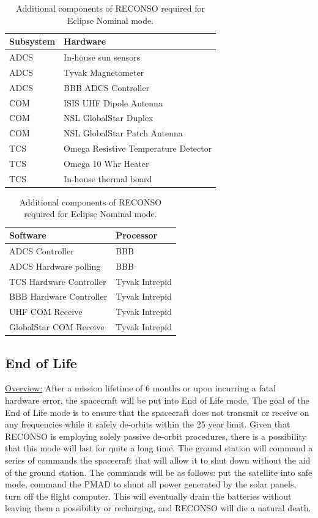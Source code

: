 \documentclass{article}
\begin{document}
\begin{table}[h!]
\caption{Additional components of RECONSO required for Eclipse Nominal mode.}
\begin{adjustbox}{center}
\begin{tabular}{|l|l|}
\hline
Subsystem & Hardware \\ \hline \hline
ADCS & In-house sun sensors  \\ \hline
ADCS & Tyvak Magnetometer \\ \hline
ADCS & BBB ADCS Controller \\ \hline \hline
COM & ISIS UHF Dipole Antenna  \\ \hline
COM & NSL GlobalStar Duplex  \\ \hline
COM & NSL GlobalStar Patch Antenna \\ \hline \hline
TCS & Omega Resistive Temperature Detector \\ \hline
TCS & Omega 10 Whr Heater  \\ \hline
TCS & In-house thermal board \\ \hline
\end{tabular}

\quad

\begin{tabular}{|l|l|}
\hline
Software & Processor \\ \hline \hline
ADCS Controller & BBB \\ \hline
ADCS Hardware polling & BBB \\ \hline \hline
TCS Hardware Controller & Tyvak Intrepid \\ \hline
BBB Hardware Controller & Tyvak Intrepid \\ \hline
UHF COM Receive & Tyvak Intrepid \\ \hline
GlobalStar COM Receive & Tyvak Intrepid \\ \hline
\end{tabular}
\end{adjustbox}
\end{table}

\newpage

\subsection{End of Life}

\underline{Overview:} After a mission lifetime of 6 months or upon incurring a fatal hardware error, the spacecraft will be put into End of Life mode. The goal of the End of Life mode is to ensure that the spacecraft does not transmit or receive on any frequencies while it safely de-orbits within the 25 year limit. Given that RECONSO is employing solely passive de-orbit procedures, there is a possibility that this mode will last for quite a long time. The ground station will command a series of commands the spacecraft that will allow it to shut down without the aid of the ground station. The commands will be as follows: put the satellite into safe mode, command the PMAD to shunt all power generated by the solar panels, turn off the flight computer. This will eventually drain the batteries without leaving them a possibility or recharging, and RECONSO will die a natural death. 
\end{document}
